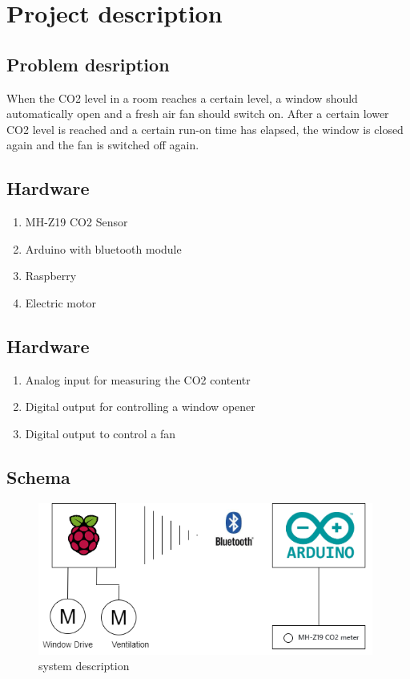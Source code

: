 \section{Project description}
\label{chapter1}

\subsection{Problem desription}

When the CO2 level in a room reaches a certain level, a window should automatically open and a fresh air fan should switch on.
After a certain lower CO2 level is reached and a certain run-on time has elapsed, the window is closed again and the fan is switched off again.

\subsection{Hardware}

\begin{enumerate}[label*=\arabic*.]
    \item \label{hw.1} MH-Z19 CO2 Sensor 
    \item \label{hw.2} Arduino with bluetooth module 
    \item \label{hw.3} Raspberry 
    \item \label{hw.4} Electric motor
\end{enumerate}

\subsection{Hardware}

\begin{enumerate}[label*=\arabic*.]
    \item \label{io.1} Analog input for measuring the CO2 contentr 
    \item \label{io.2} Digital output for controlling a window opener 
    \item \label{io.3} Digital output to control a fan 
\end{enumerate}

\subsection{Schema}

\begin{figure}[h]
	\includegraphics[height=50mm,left]{images/system}
	\centering
	\caption{system description}
	\label{fig:system}
\end{figure}






